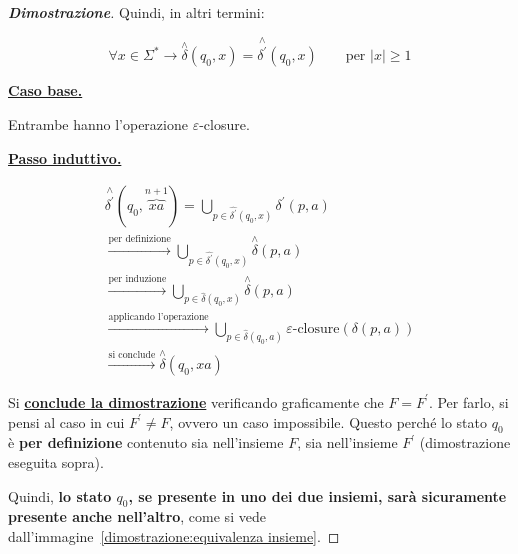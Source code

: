 \documentclass[a4paper]{article}
\begin{document}
\begin{proof}[\textbf{Dimostrazione}]
		\noindent
		Quindi, in altri termini:
		
		\begin{equation*}
			\forall x \in \Sigma^{*} \longrightarrow \overset{\wedge}{\delta}\left(q_{0}, x\right) = \overset{\wedge}{\delta^{'}}\left(q_{0}, x\right) \hspace{2em} \text{per } |x|\ge 1
		\end{equation*}
	
		\noindent
		\textbf{\underline{Caso base.}}\newline
		
		\noindent
		Entrambe hanno l'operazione $\varepsilon$-closure.
		
		\newpage
		
		\noindent
		\textbf{\underline{Passo induttivo.}}
		
		\begin{gather*}
			\overset{\wedge}{\delta^{'}}(q_{0}, \overbrace{xa}^{n+1}) = \bigcup_{p \in \hat{\delta^{'}}\left(q_{0}, x\right)} \delta^{'}\left(p, a\right) \\
			\xrightarrow{\text{per definizione}}\bigcup_{p \in \hat{\delta^{'}} \left(q_{0}, x\right)} \overset{\wedge}{\delta} \left(p, a\right) \\
			\xrightarrow{\text{per induzione}}\bigcup_{p \in \hat{\delta}\left(q_{0}, x\right)} \overset{\wedge}{\delta}\left(p, a\right) \\
			\xrightarrow{\text{applicando l'operazione}}\bigcup_{p \in \hat{\delta}\left(q_{0}, a\right)} \varepsilon\text{-closure}\left(\delta\left(p, a\right)\right) \\
			\xrightarrow{\text{si conclude}} \overset{\wedge}{\delta}\left(q_{0}, xa\right)
		\end{gather*}
	
		\noindent
		Si \textbf{\underline{conclude la dimostrazione}} verificando graficamente che $F = F^{'}$. Per farlo, si pensi al caso in cui $F^{'} \ne F$, ovvero un caso impossibile. Questo perché lo stato $q_{0}$ è \textbf{per definizione} contenuto sia nell'insieme $F$, sia nell'insieme $F^{'}$ (dimostrazione eseguita sopra).
		
		Quindi, \textbf{lo stato $q_{0}$, se presente in uno dei due insiemi, sarà sicuramente presente anche nell'altro}, come si vede dall'immagine~\ref{dimostrazione:equivalenza insieme}.
		

\end{proof}
\end{document}
